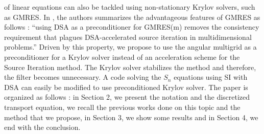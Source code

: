 of linear equations can also be tackled using non-stationary Krylov solvers, 
such as GMRES. In \cite{ttg}, the authors 
summarizes the advantageous features of GMRES as follows : ``using DSA as a 
preconditioner for GMRES(m) removes the consistency requirement that plagues 
DSA-accelerated source iteration in multidimensional problems.'' Driven by this
property, we propose to use the angular multigrid as a preconditioner for a 
Krylov solver instead of an acceleration scheme for the Source Iteration
method. The Krylov solver stabilizes the method and therefore, the filter becomes
unnecessary. A code solving the $S_n$ equations using SI with DSA can easily
be modified to use preconditioned Krylov solver. The paper is organized as 
follows : in Section 2, we present the
notation and the discretized transport equation,  we recall the
previous works done on this topic and the method that we propose, in Section
3, we show some results and in Section 4, we end with the conclusion.
